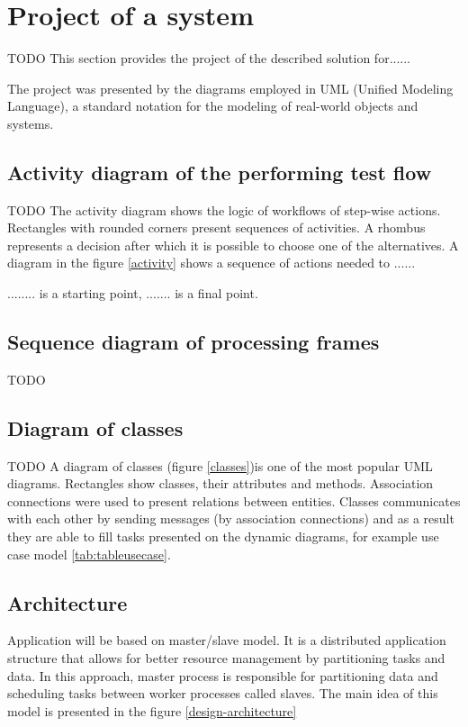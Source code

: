  
\section{Project of a system} \label{project}
TODO
This section provides the project of the described solution for......

 The project was presented by the diagrams employed in UML (Unified Modeling Language), a standard notation for the modeling of real-world objects and systems. 
 
\subsection{Activity diagram of the performing test flow}
TODO
The activity diagram shows the logic of workflows of step-wise actions. Rectangles with rounded corners present sequences of activities. A rhombus represents a decision after which it is possible to choose one of the alternatives. A diagram in the figure \ref{activity} shows a sequence of actions needed to ......

........ is a starting point, ....... is a final point. 


\subsection{Sequence diagram of processing frames}
TODO



\subsection{Diagram of classes}
TODO
A diagram of classes (figure \ref{classes})is one of the most popular UML diagrams. Rectangles show classes, their attributes and methods. Association connections were used to present relations between entities. Classes communicates with each other by sending messages (by association connections) and as a result they are able to fill tasks presented on the dynamic diagrams, for example use case model \ref{tab:tableusecase}.

 
  

\subsection{Architecture}
Application will be based on master/slave model. It is a distributed application structure that allows for better resource management by partitioning tasks and data. In this approach, master process is responsible for partitioning data and scheduling tasks between worker processes called slaves. The main idea of this model is presented in the figure \ref{design-architecture}

